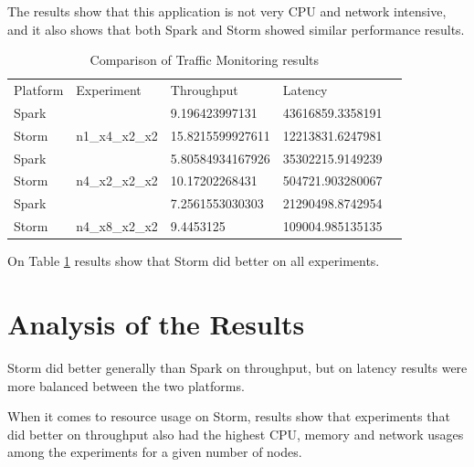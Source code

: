 \documentclass[ppgc,diss,english]{iiufrgs}
\begin{document}
The results show that this application is not very CPU and network intensive, and it also shows that both Spark and Storm showed similar performance results.

\begin{table}[H]
\tiny
\centering
\caption{Comparison of Traffic Monitoring results}
\label{table:traffic-monitoring-results}
\begin{tabular}{|l|l|l|l|l}
\cline{1-4}
Platform & Experiment                       & Throughput                               & Latency                                  &  \\ \cline{1-4}
Spark    &                                  & 9.196423997131                           & 43616859.3358191                         &  \\ \cline{1-1} \cline{3-4}
Storm    & \multirow{-2}{*}{n1\_x4\_x2\_x2} & \cellcolor[HTML]{67FD9A}15.8215599927611 & \cellcolor[HTML]{67FD9A}12213831.6247981 &  \\ \cline{1-4}
Spark    &                                  & 5.80584934167926                         & 35302215.9149239                         &  \\ \cline{1-1} \cline{3-4}
Storm    & \multirow{-2}{*}{n4\_x2\_x2\_x2} & \cellcolor[HTML]{67FD9A}10.17202268431   & \cellcolor[HTML]{67FD9A}504721.903280067 &  \\ \cline{1-4}
Spark    &                                  & 7.2561553030303                          & 21290498.8742954                         &  \\ \cline{1-1} \cline{3-4}
Storm    & \multirow{-2}{*}{n4\_x8\_x2\_x2} & \cellcolor[HTML]{67FD9A}9.4453125        & \cellcolor[HTML]{67FD9A}109004.985135135 &  \\ \cline{1-4}
\end{tabular}
\end{table}

On Table \ref{table:traffic-monitoring-results} results show that Storm did better on all experiments.


\section{Analysis of the Results}

Storm did better generally than Spark on throughput, but on latency results were more balanced between the two platforms.

When it comes to resource usage on Storm, results show that experiments that did better on throughput also had the highest CPU, memory and network usages among the experiments for a given number of nodes.
\end{document}
